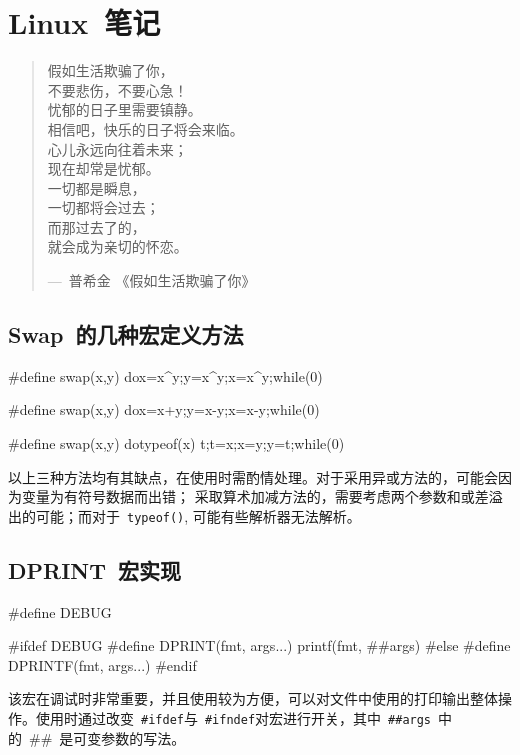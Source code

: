 \chapter{Linux~笔记}

\begin{center}
\begin{quotation}
假如生活欺骗了你，\\
不要悲伤，不要心急！\\
忧郁的日子里需要镇静。\\
相信吧，快乐的日子将会来临。\\
心儿永远向往着未来；\\
现在却常是忧郁。\\
一切都是瞬息，\\
一切都将会过去；\\
而那过去了的，\\
就会成为亲切的怀恋。\\
\begin{flushright}
---~普希金 《假如生活欺骗了你》
\end{flushright}
\end{quotation}
\end{center}

\section{Swap~的几种宏定义方法}
\label{sec:swap}
\begin{code}
#define swap(x,y)  do{x=x^y;y=x^y;x=x^y;}while(0)

#define swap(x,y)  do{x=x+y;y=x-y;x=x-y;}while(0)

#define swap(x,y)  do{typeof(x) t;t=x;x=y;y=t;}while(0)
\end{code}

以上三种方法均有其缺点，在使用时需酌情处理。对于采用异或方法的，可能会因为变量为有符号数据而出错； 采取算术加减方法的，需要考虑两个参数和或差溢出的可能；而对于~\verb|typeof()|, 可能有些解析器无法解析。

\section{DPRINT~宏实现}
\label{sec:dprint}
\begin{code}
#define  DEBUG

#ifdef DEBUG
#define DPRINT(fmt, args...)  printf(fmt, ##args)
#else
#define DPRINTF(fmt, args...)
#endif
\end{code}

该宏在调试时非常重要，并且使用较为方便，可以对文件中使用的打印输出整体操作。使用时通过改变~\verb|#ifdef|与~\verb|#ifndef|对宏进行开关，其中~\verb|##args|~中的~\#\#~是可变参数的写法。

